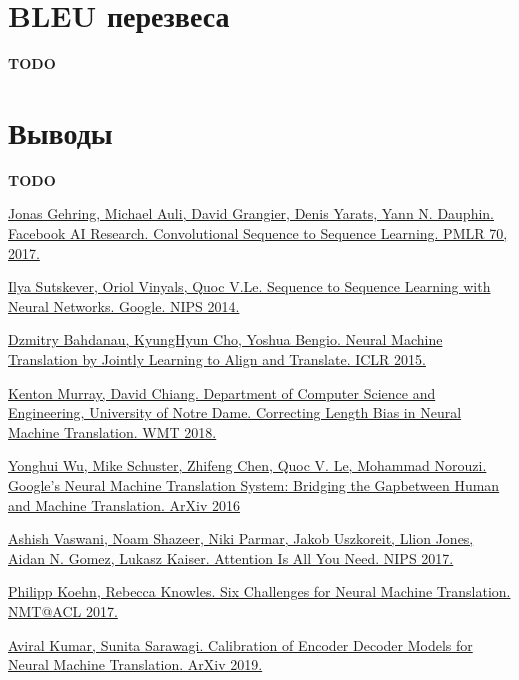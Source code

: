 \documentclass[a4paper,14pt]{extarticle}
\begin{document}
\section{BLEU перезвеса}
	\textbf{TODO}
	
\section{Выводы}
	\textbf{TODO}
	
	
	

	\begin{thebibliography}{0}		
		\hypertarget{fconv}{}
		\href{https://arxiv.org/pdf/1705.03122.pdf}
		{Jonas Gehring, Michael Auli, David Grangier, Denis Yarats, Yann N. Dauphin. Facebook AI Research. Convolutional Sequence to Sequence Learning. PMLR 70, 2017.}
		
		\hypertarget{seq2seq}{}
		\href{https://papers.nips.cc/paper/5346-sequence-to-sequence-learning-with-neural-networks.pdf}
		{Ilya Sutskever, Oriol Vinyals, Quoc V.Le. Sequence to Sequence Learning with Neural Networks. Google. NIPS 2014.}
		
		\hypertarget{encdec_att}{}
		\href{https://arxiv.org/pdf/1409.0473.pdf}
		{Dzmitry Bahdanau, KyungHyun Cho, Yoshua Bengio. Neural Machine Translation by Jointly Learning to Align and Translate. ICLR 2015.}
		
		\hypertarget{corr_len_bias}{}
		\href{https://arxiv.org/pdf/1808.10006.pdf}
		{Kenton Murray, David Chiang. Department of Computer Science and Engineering, University of Notre Dame. Correcting Length Bias in Neural Machine Translation. WMT 2018.}
		
		\hypertarget{gnmt}{}
		\href{https://arxiv.org/pdf/1609.08144.pdf}
		{Yonghui Wu, Mike Schuster, Zhifeng Chen, Quoc V. Le, Mohammad Norouzi. Google’s Neural Machine Translation System: Bridging the Gapbetween Human and Machine Translation. ArXiv 2016}
		
		\hypertarget{transformer}{}
		\href{https://arxiv.org/pdf/1706.03762.pdf}
		{Ashish Vaswani, Noam Shazeer, Niki Parmar, Jakob Uszkoreit, Llion Jones, Aidan N. Gomez, Lukasz Kaiser. Attention Is All You Need. NIPS 2017.}
		
		\hypertarget{six_chall}{}
		\href{https://arxiv.org/pdf/1706.03872.pdf}
		{Philipp Koehn, Rebecca Knowles. Six Challenges for Neural Machine Translation. NMT@ACL 2017.}
		
		\hypertarget{calibration}{}
		\href{https://arxiv.org/pdf/1903.00802v1.pdf}
		{Aviral Kumar, Sunita Sarawagi. Calibration of Encoder Decoder Models for Neural Machine Translation. ArXiv 2019.}
		

\end{thebibliography}
\end{document}

